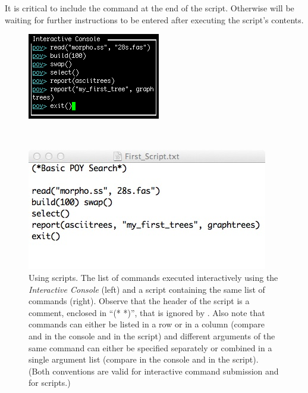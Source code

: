 {It is  critical to include the command  at the
end of the script. Otherwise \poy will be waiting for further
instructions to be entered after executing the script's contents.

\begin{figure}
\centering
\begin{minipage}[c]{0.42\textwidth}
\includegraphics[width=\textwidth]{doc/figures/commandlist.jpg}
\end{minipage}
\,
\begin{minipage}[c]{0.53\textwidth}
\includegraphics[width=\textwidth]{doc/figures/script.jpg}
\end{minipage}
\caption{Using \poy scripts. The list of commands executed interactively
using the \emph{Interactive Console} (left) and a script containing
the same list of commands (right). Observe that the header of the
script is a comment, enclosed in ``(* *)'', that is ignored by \poy.
Also note that commands can either be listed in a row or in a column
(compare  and  in the
console and in the script) and different arguments of the same
command can either be specified separately or combined in a single
argument list (compare  in the console and
in the script). (Both conventions are valid for interactive command
submission and for scripts.)} 
\label{fig:script}
\end{figure}

}
